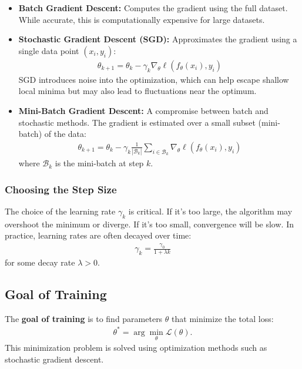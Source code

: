 \begin{itemize}
	\item \textbf{Batch Gradient Descent:} Computes the gradient using the full dataset. While accurate, this is computationally expensive for large datasets.
	
	\item \textbf{Stochastic Gradient Descent (SGD):} Approximates the gradient using a single data point $(x_i, y_i)$:
	\begin{align}
		\theta_{k+1} = \theta_k - \gamma_k \nabla_\theta \ell(f_\theta(x_i), y_i)
	\end{align}
	SGD introduces noise into the optimization, which can help escape shallow local minima but may also lead to fluctuations near the optimum.
	
	\item \textbf{Mini-Batch Gradient Descent:} A compromise between batch and stochastic methods. The gradient is estimated over a small subset (mini-batch) of the data:
	\begin{align}
		\theta_{k+1} = \theta_k - \gamma_k \frac{1}{|\mathcal{B}_k|} \sum_{i \in \mathcal{B}_k} \nabla_\theta \ell(f_\theta(x_i), y_i)
	\end{align}
	where $\mathcal{B}_k$ is the mini-batch at step $k$.
\end{itemize}

\subsubsection*{Choosing the Step Size}

The choice of the learning rate $\gamma_k$ is critical. If it's too large, the algorithm may overshoot the minimum or diverge. If it's too small, convergence will be slow. In practice, learning rates are often decayed over time:
\begin{align}
	\gamma_k = \frac{\gamma_0}{1 + \lambda k}
\end{align}
for some decay rate $\lambda > 0$.

\subsection{Goal of Training}

The \textbf{goal of training} is to find parameters $\theta$ that minimize the total loss:
\begin{align}
	\theta^* = \arg\min_{\theta} \mathcal{L}(\theta).
\end{align}
This minimization problem is solved using optimization methods such as stochastic gradient descent.

